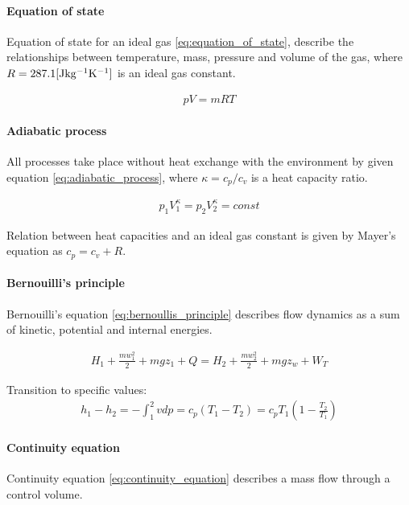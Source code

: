 \paragraph{Equation of state}
Equation of state for an ideal gas \ref{eq:equation_of_state}, describe the relationships between
temperature, mass, pressure and volume of the gas, where $R=287.1 \rm [Jkg^{-1}K^{-1}]$ is an ideal gas
constant.

\begin{align}
    pV = mRT
    \label{eq:equation_of_state}
\end{align} 

\paragraph{Adiabatic process}
All processes take place without heat exchange with the environment by
given equation \ref{eq:adiabatic_process}, where $\kappa = c_p/c_v$ is a
heat capacity ratio.

\begin{align}
     p_1V_1^{\kappa} =  p_2V_2^{\kappa} = const
    \label{eq:adiabatic_process}
\end{align}

Relation between heat capacities and an ideal gas constant is given
by Mayer's equation as $c_p = c_v + R$.



\paragraph{Bernouilli's principle}
Bernouilli's equation \ref{eq:bernoullis_principle} describes flow
dynamics as a sum of kinetic, potential and internal energies.

\begin{align}
    H_1 + \frac{mw_1^2}{2} + mgz_1 + Q = H_2 + \frac{mw_2^2}{2} + mgz_w +
    W_T
    \label{eq:bernoullis_principle}
\end{align}

Transition to specific values:
\begin{align}
    h_1- h_2 = -\int_1^2 v dp = c_p(T_1-T_2) = 
    c_p T_1\left(1-\frac{T_2}{T_1}\right)
    \label{eq:etalpi_sub}
\end{align}

\paragraph{Continuity equation}
Continuity equation \ref{eq:continuity_equation} describes a mass flow
through a control volume.


